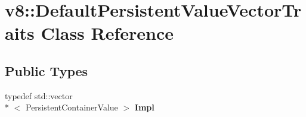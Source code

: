 \hypertarget{classv8_1_1DefaultPersistentValueVectorTraits}{\section{v8\-:\-:Default\-Persistent\-Value\-Vector\-Traits Class Reference}
\label{classv8_1_1DefaultPersistentValueVectorTraits}
}
\subsection*{Public Types}
\begin{DoxyCompactItemize}
\item 
\hypertarget{classv8_1_1DefaultPersistentValueVectorTraits_ac5093f7deea6cfc8672c529be4afdef4}{typedef std\-::vector\\*
$<$ Persistent\-Container\-Value $>$ {\bfseries Impl}}\label{classv8_1_1DefaultPersistentValueVectorTraits_ac5093f7deea6cfc8672c529be4afdef4}

\end{DoxyCompactItemize}
